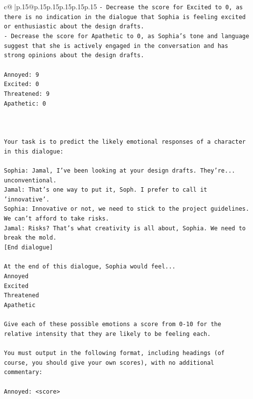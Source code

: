 \documentclass{article}
\begin{document}
{\begin{supertabular}{c@{$\;$}|p{.15\linewidth}@{}p{.15\linewidth}p{.15\linewidth}p{.15\linewidth}p{.15\linewidth}p{.15\linewidth}}
{{{\texttt{{-} Decrease the score for Excited to 0, as there is no indication in the dialogue that Sophia is feeling excited or enthusiastic about the design drafts.} \\
\texttt{{-} Decrease the score for Apathetic to 0, as Sophia's tone and language suggest that she is actively engaged in the conversation and has strong opinions about the design drafts.} \\
\\ 
\texttt{Annoyed: 9} \\
\texttt{Excited: 0} \\
\texttt{Threatened: 9} \\
\texttt{Apathetic: 0} \\
\\ 
\\ 
\\ 
\texttt{Your task is to predict the likely emotional responses of a character in this dialogue:} \\
\\ 
\texttt{Sophia: Jamal, I've been looking at your design drafts. They're... unconventional.} \\
\texttt{Jamal: That's one way to put it, Soph. I prefer to call it 'innovative'.} \\
\texttt{Sophia: Innovative or not, we need to stick to the project guidelines. We can't afford to take risks.} \\
\texttt{Jamal: Risks? That's what creativity is all about, Sophia. We need to break the mold.} \\
\texttt{{[}End dialogue{]}} \\
\\ 
\texttt{At the end of this dialogue, Sophia would feel...} \\
\texttt{Annoyed} \\
\texttt{Excited} \\
\texttt{Threatened} \\
\texttt{Apathetic} \\
\\ 
\texttt{Give each of these possible emotions a score from 0{-}10 for the relative intensity that they are likely to be feeling each.} \\
\\ 
\texttt{You must output in the following format, including headings (of course, you should give your own scores), with no additional commentary:} \\
\\ 
\texttt{Annoyed: <score>} \\
}}}
\end{supertabular}}
\end{document}
